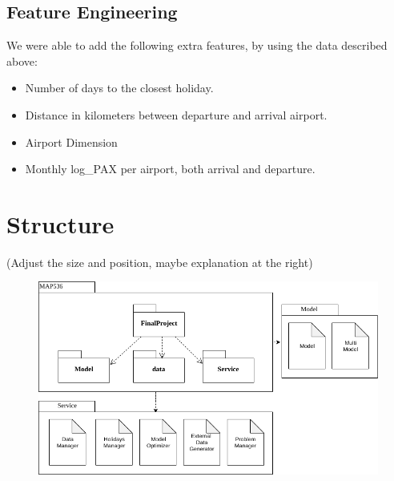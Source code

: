 \documentclass[a4paper,12pt,twoside]{article}
\begin{document}
\subsection{Feature Engineering}

We were able to add the following extra features, by using the data described above:
\begin{itemize}
	\item Number of days to the closest holiday.
	\item Distance in kilometers between departure and arrival airport.
	\item Airport Dimension
	\item Monthly log\_PAX per airport, both arrival and departure.
\end{itemize}


\section{Structure}
(Adjust the size and position, maybe explanation at the right)

\begin{figure}[H]
	\centering
	\includegraphics[scale=0.5]{UML.png}
\end{figure}
\end{document}
